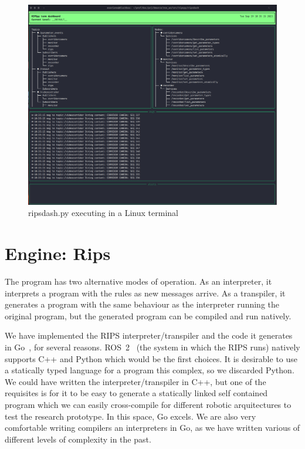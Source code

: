 \documentclass[a4paper]{article}
\begin{document}
\begin{figure}[t]
\begin{center}
\includegraphics[width=\textwidth]{figs/ripsdash.png}
\caption{ripsdash.py executing in a Linux terminal \label{fig:dash}}
\end{center}
\end{figure}

\section{Engine: Rips \label{sect:rips}}

The program has two alternative modes of operation. As an interpreter,
it interprets a program with the rules as new messages arrive.
As a transpiler, it generates a program with the same behaviour as
the interpreter running the original program, but the generated program
can be compiled and run natively.

We have implemented the RIPS interpreter/transpiler and the code it generates
in Go~\cite{go}, for several reasons.  ROS~2~\cite{ros2} (the system in
which the RIPS runs) natively supports C++ and Python which would be the
first choices. It is desirable to use a statically typed language for
a program this complex, so we discarded Python. We could have written
the interpreter/transpiler in C++, but one of the requisites is for
it to be easy to generate a statically linked self contained program
which we can easily cross-compile for different robotic arquitectures
to test the research prototype. In this space, Go excels. We are also
very comfortable writing compilers an interpreters in Go,
as we have written various of different levels of complexity in the past.
\end{document}

